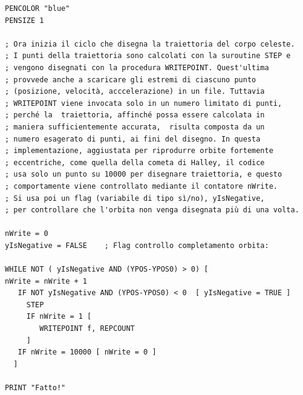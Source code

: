 \begin{lstlisting}[frame=single]
PENCOLOR "blue"
PENSIZE 1

; Ora inizia il ciclo che disegna la traiettoria del corpo celeste. 
; I punti della traiettoria sono calcolati con la suroutine STEP e 
; vengono disegnati con la procedura WRITEPOINT. Quest'ultima 
; provvede anche a scaricare gli estremi di ciascuno punto 
; (posizione, velocità, acccelerazione) in un file. Tuttavia 
; WRITEPOINT viene invocata solo in un numero limitato di punti, 
; perché la  traiettoria, affinché possa essere calcolata in 
; maniera sufficientemente accurata,  risulta composta da un 
; numero esagerato di punti, ai fini del disegno. In questa 
; implementazione, aggiustata per riprodurre orbite fortemente 
; eccentriche, come quella della cometa di Halley, il codice 
; usa solo un punto su 10000 per disegnare traiettoria, e questo 
; comportamente viene controllato mediante il contatore nWrite.
; Si usa poi un flag (variabile di tipo sì/no), yIsNegative, 
; per controllare che l'orbita non venga disegnata più di una volta.

nWrite = 0
yIsNegative = FALSE    ; Flag controllo completamento orbita:

WHILE NOT ( yIsNegative AND (YPOS-YPOS0) > 0) [
nWrite = nWrite + 1
   IF NOT yIsNegative AND (YPOS-YPOS0) < 0  [ yIsNegative = TRUE ]
     STEP  
     IF nWrite = 1 [
        WRITEPOINT f, REPCOUNT
     ]
   IF nWrite = 10000 [ nWrite = 0 ]
  ]

PRINT "Fatto!"
\end{lstlisting}

\vskip 1cm

